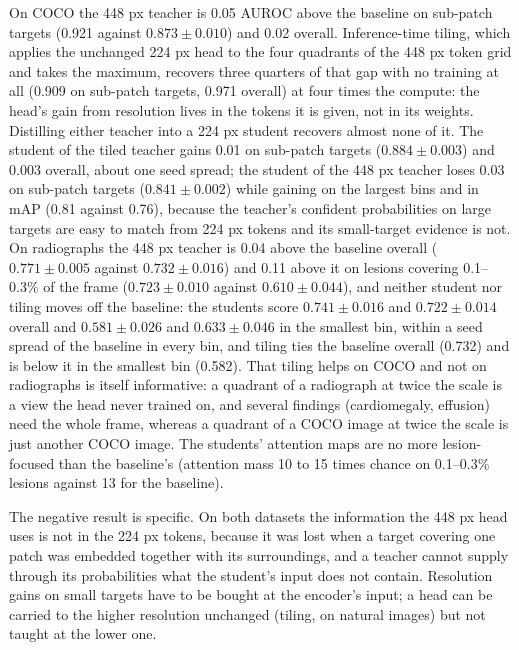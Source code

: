 \documentclass[10pt,letterpaper,twocolumn]{article}
\begin{document}
On COCO the 448 px teacher is 0.05 AUROC above the baseline on sub-patch targets (0.921
against $0.873\pm0.010$) and 0.02 overall. Inference-time tiling, which applies the unchanged
224 px head to the four quadrants of the 448 px token grid and takes the maximum, recovers
three quarters of that gap with no training at all (0.909 on sub-patch targets, 0.971
overall) at four times the compute: the head's gain from resolution lives in the tokens it
is given, not in its weights. Distilling either teacher into a 224 px student recovers
almost none of it. The student of the tiled teacher gains 0.01 on sub-patch targets
($0.884\pm0.003$) and 0.003 overall, about one seed spread; the student of the 448 px teacher
loses 0.03 on sub-patch targets ($0.841\pm0.002$) while gaining on the largest bins and in
mAP (0.81 against 0.76), because the teacher's confident probabilities on large targets are
easy to match from 224 px tokens and its small-target evidence is not. On radiographs the
448 px teacher is 0.04 above the baseline overall ($0.771\pm0.005$ against $0.732\pm0.016$)
and 0.11 above it on lesions covering 0.1--0.3\% of the frame ($0.723\pm0.010$ against
$0.610\pm0.044$), and neither student nor tiling moves off the baseline: the students score
$0.741\pm0.016$ and $0.722\pm0.014$ overall and $0.581\pm0.026$ and $0.633\pm0.046$ in the
smallest bin, within a seed spread of the baseline in every bin, and tiling ties the
baseline overall (0.732) and is below it in the smallest bin (0.582). That tiling helps on
COCO and not on radiographs is itself informative: a quadrant of a radiograph at twice the
scale is a view the head never trained on, and several findings (cardiomegaly, effusion)
need the whole frame, whereas a quadrant of a COCO image at twice the scale is just another
COCO image. The students' attention maps are no more lesion-focused than the baseline's
(attention mass 10 to 15 times chance on 0.1--0.3\% lesions against 13 for the baseline).

The negative result is specific. On both datasets the information the 448 px head uses is
not in the 224 px tokens, because it was lost when a target covering one patch was embedded
together with its surroundings, and a teacher cannot supply through its probabilities what
the student's input does not contain. Resolution gains on small targets have to be bought at
the encoder's input; a head can be carried to the higher resolution unchanged (tiling, on
natural images) but not taught at the lower one.
\end{document}
